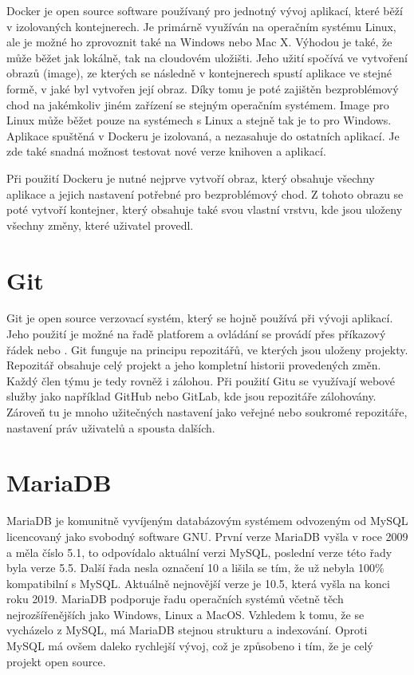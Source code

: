 Docker je open source software používaný pro jednotný vývoj aplikací,
které běží v izolovaných kontejnerech. Je primárně využíván na
operačním systému Linux, ale je možné ho zprovoznit také na Windows
nebo Mac  X. Výhodou je také, že může běžet jak lokálně, tak na
cloudovém uložišti. Jeho užití spočívá ve vytvoření obrazů (image), ze 
kterých se následně v kontejnerech spustí aplikace ve stejné formě, 
v jaké byl vytvořen její obraz. Díky tomu je poté zajištěn bezproblémový 
chod na jakémkoliv jiném zařízení se stejným operačním systémem. Image 
pro Linux může běžet pouze na systémech s Linux a stejně tak je to pro
Windows. Aplikace spuštěná v Dockeru je izolovaná, a nezasahuje do
ostatních aplikací. Je zde také snadná možnost testovat nové verze
knihoven a aplikací.

Při použití Dockeru je nutné nejprve vytvoří obraz, který obsahuje 
všechny aplikace a jejich nastavení potřebné pro bezproblémový chod. 
Z tohoto obrazu se poté vytvoří kontejner, který obsahuje také svou 
vlastní vrstvu, kde jsou uloženy všechny změny, které uživatel provedl.
\cite{docker}



\section{Git}

Git je open source verzovací systém, který se hojně používá při vývoji
aplikací. Jeho použití je možné na řadě platforem a ovládání
se provádí přes příkazový řádek nebo . Git funguje na principu
repozitářů, ve kterých jsou uloženy projekty. Repozitář obsahuje celý
projekt a jeho kompletní historii provedených změn. Každý člen týmu je
tedy rovněž i zálohou. Při použití Gitu se využívají webové služby
jako například GitHub nebo GitLab, kde jsou repozitáře
zálohovány. Zároveň tu je mnoho užitečných nastavení jako veřejné nebo
soukromé repozitáře, nastavení práv uživatelů a spousta dalších. \cite{git}

\newpage

\section{MariaDB}

MariaDB je komunitně vyvíjeným databázovým systémem odvozeným od MySQL
licencovaný jako svobodný software GNU. První verze MariaDB vyšla v
roce 2009 a měla číslo 5.1, to odpovídalo aktuální verzi MySQL,
poslední verze této řady byla verze 5.5. Další řada nesla označení 10
a lišila se tím, že už nebyla 100\% kompatibilní s MySQL. Aktuálně 
nejnovější verze je 10.5, která vyšla na konci roku 2019. MariaDB
podporuje řadu operačních systémů včetně těch nejrozšířenějších jako
Windows, Linux a MacOS. Vzhledem k tomu, že se vycházelo z MySQL, má
MariaDB stejnou strukturu a indexování. Oproti MySQL má ovšem daleko
rychlejší vývoj, což je způsobeno i tím, že je celý projekt open
source. \cite{mariadb}

